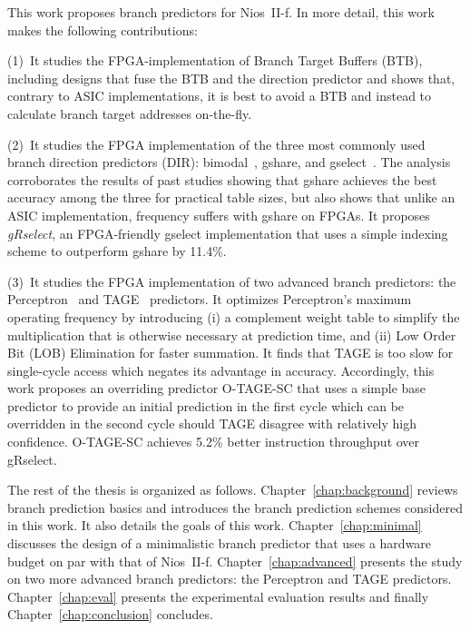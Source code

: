 This work proposes branch predictors for Nios~II-f. In more detail, this work makes the following contributions:

(1)~It studies the FPGA-implementation of Branch Target Buffers (BTB), including designs that fuse the BTB and the direction predictor and shows that, contrary to ASIC implementations, it is best to avoid a BTB and instead to calculate branch target addresses on-the-fly.

(2)~It studies the FPGA implementation of the three most commonly used branch direction predictors (DIR): bimodal~\cite{bimodal}, gshare, and gselect~\cite{McFarling}. The analysis corroborates the results of past studies showing that gshare achieves the best accuracy among the three for practical table sizes, but also shows that unlike an ASIC implementation, frequency suffers with gshare on FPGAs. It proposes \textit{gRselect}, an FPGA-friendly gselect implementation that uses a simple indexing scheme to outperform gshare by 11.4\%.

(3)~It studies the FPGA implementation of two advanced branch predictors: the Perceptron~\cite{perceptron} and TAGE~\cite{tage} predictors. It optimizes Perceptron's maximum operating frequency by introducing (i) a complement weight table to simplify the multiplication that is otherwise necessary at prediction time, and (ii) Low Order Bit (LOB) Elimination for faster summation. It finds that TAGE is too slow for single-cycle access which negates its advantage in accuracy. Accordingly, this work proposes an overriding predictor \mbox{O-TAGE-SC} that uses a simple base predictor to provide an initial prediction in the first cycle which can be overridden in the second cycle should TAGE disagree with relatively high confidence. \mbox{O-TAGE-SC} achieves 5.2\% better instruction throughput over gRselect.

The rest of the thesis is organized as follows. Chapter~\ref{chap:background} reviews branch prediction basics and introduces the branch prediction schemes considered in this work. It also details the goals of this work. Chapter~\ref{chap:minimal} discusses the design of a minimalistic branch predictor that uses a hardware budget on par with that of Nios~II-f. Chapter~\ref{chap:advanced} presents the study on two more advanced branch predictors: the Perceptron and TAGE predictors. Chapter~\ref{chap:eval} presents the experimental evaluation results and finally Chapter~\ref{chap:conclusion} concludes.





